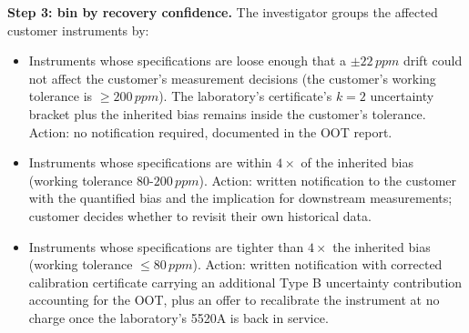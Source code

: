 \textbf{Step 3: bin by recovery confidence.} The investigator
groups the affected customer instruments by:
\begin{itemize}[leftmargin=*]
  \item Instruments whose specifications are loose enough that
    a $\pm 22\,\si{ppm}$ drift could not affect the customer's
    measurement decisions (the customer's working tolerance is
    $\geq 200\,\si{ppm}$). The laboratory's certificate's $k = 2$
    uncertainty bracket plus the inherited bias remains inside
    the customer's tolerance. Action: no notification required,
    documented in the OOT report.
  \item Instruments whose specifications are within $4\times$ of
    the inherited bias (working tolerance $80$-$200\,\si{ppm}$).
    Action: written notification to the customer with the
    quantified bias and the implication for downstream
    measurements; customer decides whether to revisit their own
    historical data.
  \item Instruments whose specifications are tighter than $4\times$
    the inherited bias (working tolerance $\leq 80\,\si{ppm}$).
    Action: written notification with corrected calibration
    certificate carrying an additional Type B uncertainty
    contribution accounting for the OOT, plus an offer to
    recalibrate the instrument at no charge once the laboratory's
    5520A is back in service.
\end{itemize}

